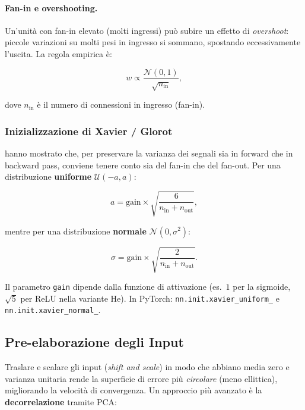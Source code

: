 \paragraph{Fan-in e overshooting.}
Un'unità con fan-in elevato (molti ingressi) può subire un effetto di
\emph{overshoot}: piccole variazioni su molti pesi in ingresso si sommano,
spostando eccessivamente l'uscita. La regola empirica è:

\begin{equation}
  w \propto \frac{\mathcal{N}(0,1)}{\sqrt{n_{\text{in}}}},
\end{equation}

dove $n_{\text{in}}$ è il numero di connessioni in ingresso (fan-in).

\subsubsection{Inizializzazione di Xavier / Glorot}
\label{subsubsec:xavier}

\citet{glorot2010} hanno mostrato che, per preservare la varianza dei segnali
sia in forward che in backward pass, conviene tenere conto sia del fan-in che del
fan-out. Per una distribuzione \textbf{uniforme} $\mathcal{U}(-a, a)$:

\begin{equation}
  a = \text{gain} \times \sqrt{\frac{6}{n_{\text{in}} + n_{\text{out}}}},
\end{equation}

mentre per una distribuzione \textbf{normale} $\mathcal{N}(0, \sigma^2)$:

\begin{equation}
  \sigma = \text{gain} \times \sqrt{\frac{2}{n_{\text{in}} + n_{\text{out}}}}.
\end{equation}

Il parametro \texttt{gain} dipende dalla funzione di attivazione (es.\ $1$ per
la sigmoide, $\sqrt{5}$ per ReLU nella variante He). In PyTorch:
\texttt{nn.init.xavier\_uniform\_} e \texttt{nn.init.xavier\_normal\_}.

\subsection{Pre-elaborazione degli Input}
\label{subsec:input-preprocessing}

Traslare e scalare gli input (\emph{shift and scale}) in modo che abbiano
media zero e varianza unitaria rende la superficie di errore più \emph{circolare}
(meno ellittica), migliorando la velocità di convergenza. Un approccio più
avanzato è la \textbf{decorrelazione} tramite PCA:

